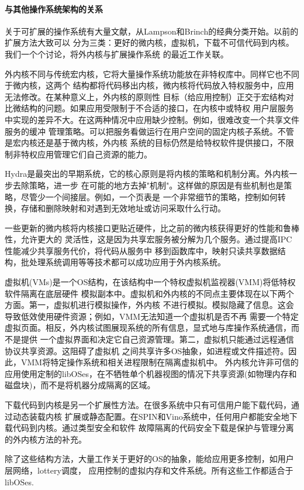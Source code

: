 \documentclass[12pt,openany,a4paper]{report}
\begin{document}
	\paragraph{与其他操作系统架构的关系}
	    关于可扩展的操作系统有大量文献，从Lampson和Brinch的经典分类开始。以前的扩展方法大致可以
	分为三类：更好的微内核，虚拟机，下载不可信代码到内核。我们一个个讨论，将外内核与扩展操作系统
	的最近工作关联。\par
	    外内核不同与传统宏内核，它将大量操作系统功能放在非特权库中。同样它也不同于微内核，这两个
	结构都将代码移出内核，微内核将代码放入特权服务中，应用无法修改。在某种意义上，外内核的原则性
	目标（给应用控制）正交于宏结构对比微结构的问题。如果应用受限制于不合适的接口，在内核中或特权
	用户层服务中实现的差异不大。在这两种情况中应用缺少控制。例如，很难改变一个共享文件服务的缓冲
	管理策略。可以把服务看做运行在用户空间的固定内核子系统。不管是宏内核还是基于微内核，外内核
	系统的目标仍然是给特权软件提供接口，不限制非特权应用管理它们自己资源的能力。\par
	    Hydra是最突出的早期系统，它的核心原则是将内核的策略和机制分离。外内核一步去除策略，进一步
	在可能的地方去掉"机制"。这样做的原因是有些机制也是策略，尽管少一个间接层。例如，一个页表是
	一个非常细节的策略，控制如何转换，存储和删除映射和对遇到无效地址或访问采取什么行动。\par
	    一些更新的微内核将内核接口更贴近硬件，比之前的微内核获得更好的性能和鲁棒性，允许更大的
	灵活性，这是因为共享宏服务被分解为几个服务。通过提高IPC性能减少共享服务代价，将代码从服务中
	移到函数库中，映射只读共享数据结构，批处理系统调用等等技术都可以成功应用于外内核系统。\par
	    虚拟机(VMs)是一个OS结构，在该结构中一个特权虚拟机监视器(VMM)将低特权软件隔离在底层硬件
	模拟副本中。虚拟机和外内核的不同点主要体现在以下两个方面。第一，虚拟机进行模拟操作，外内核
	不进行模拟。模拟隐藏了信息。这会导致低效使用硬件资源；例如，VMM无法知道一个虚拟机是否不再
	需要一个特定虚拟页面。相反，外内核试图展现系统的所有信息，显式地与库操作系统通信，而不是提供
	一个虚拟界面和决定它自己资源管理。第二，虚拟机只能通过远程通信协议共享资源。这阻碍了虚拟机
	之间共享许多OS抽象，如进程或文件描述符。因此，VMM将特定操作系统和相关进程限制在隔离虚拟机中。
	外内核允许非可信的应用使用定制的libOSes，在不牺牲单个机器视图的情况下共享资源(如物理内存和
	磁盘块)，而不是将机器分成隔离的区域。\par
	    下载代码到内核是另一个扩展性方法。在很多系统中只有可信用户能下载代码，通过动态装载内核
	扩展或静态配置。在SPIN和Vino系统中，任何用户都能安全地下载代码到内核。通过类型安全和软件
	故障隔离的代码安全下载是保护与管理分离的外内核方法的补充。\par
	    除了这些结构方法，大量工作关于更好的OS的抽象，能给应用更多控制，如用户层网络，lottery调度，
	应用控制的虚拟内存和文件系统。所有这些工作都适合于libOSes.\par
\end{document}
